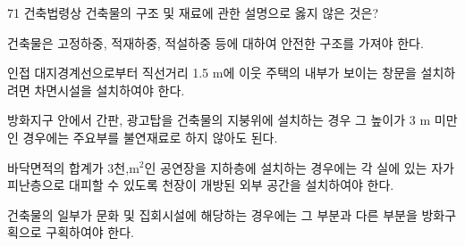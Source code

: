 \begin{question}{71}
건축법령상 건축물의 구조 및 재료에 관한 설명으로 옳지 않은 것은?
\begin{choices}
  \item 건축물은 고정하중, 적재하중, 적설하중 등에 대하여 안전한 구조를 가져야 한다.
  \item 인접 대지경계선으로부터 직선거리 1.5 m에 이웃 주택의 내부가 보이는 창문을 설치하려면 차면시설을 설치하여야 한다.
  \item 방화지구 안에서 간판, 광고탑을 건축물의 지붕위에 설치하는 경우 그 높이가 3 m 미만인 경우에는 주요부를 불연재료로 하지 않아도 된다.
  \item 바닥면적의 합계가 3천,m$^2$인 공연장을 지하층에 설치하는 경우에는 각 실에 있는 자가 피난층으로 대피할 수 있도록 천장이 개방된 외부 공간을 설치하여야 한다.
  \item 건축물의 일부가 문화 및 집회시설에 해당하는 경우에는 그 부분과 다른 부분을 방화구획으로 구획하여야 한다.
\end{choices}
\end{question}
